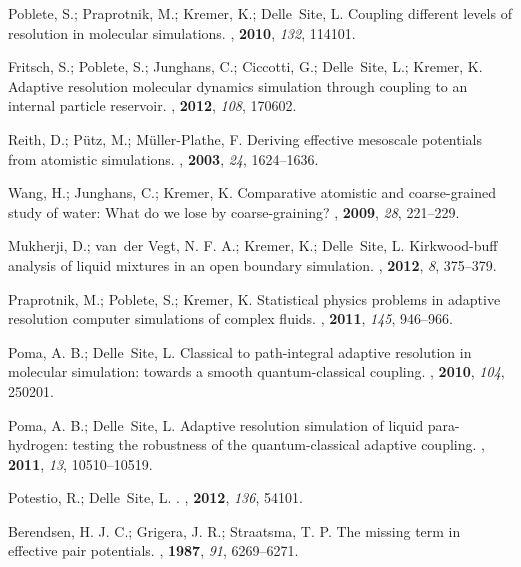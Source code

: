 \documentclass[aps,prb,preprint,citeautoscript]{revtex4}
\begin{document}
\begin{thebibliography}{10}
Poblete, S.; Praprotnik, M.; Kremer, K.; Delle~Site, L.
\newblock Coupling different levels of resolution in molecular simulations.
, \textbf{2010}, \textit{132}, 114101.

Fritsch, S.; Poblete, S.; Junghans, C.; Ciccotti, G.; Delle~Site, L.; Kremer, K.
\newblock Adaptive resolution molecular dynamics simulation through coupling to
  an internal particle reservoir.
, \textbf{2012}, \textit{108}, 170602.

Reith, D.; P{\"u}tz, M.; M{\"u}ller-Plathe, F.
\newblock Deriving effective mesoscale potentials from atomistic simulations.
, \textbf{2003}, \textit{24}, 1624--1636.

Wang, H.; Junghans, C.; Kremer, K.
\newblock Comparative atomistic and coarse-grained study of water: What do we
  lose by coarse-graining?
, \textbf{2009}, \textit{28}, 221--229.

Mukherji, D.; van~der Vegt, N. F. A.; Kremer, K.; Delle~Site, L.
\newblock Kirkwood-buff analysis of liquid mixtures in an open boundary
  simulation.
, \textbf{2012},  \textit{8}, 375--379.

Praprotnik, M.; Poblete, S.; Kremer, K.
\newblock Statistical physics problems in adaptive resolution computer
  simulations of complex fluids.
, \textbf{2011}, \textit{145}, 946--966.

Poma, A. B.; Delle~Site, L.
\newblock Classical to path-integral adaptive resolution in molecular
  simulation: towards a smooth quantum-classical coupling.
, \textbf{2010}, \textit{104}, 250201.

Poma, A. B.; Delle~Site, L.
\newblock Adaptive resolution simulation of liquid para-hydrogen: testing the
  robustness of the quantum-classical adaptive coupling.
, \textbf{2011}, \textit{13}, 10510--10519.

Potestio, R.; Delle~Site, L.
.
, \textbf{2012}, \textit{136}, 54101.

Berendsen, H. J. C.; Grigera, J. R.; Straatsma, T. P.
\newblock The missing term in effective pair potentials.
, \textbf{1987}, \textit{91}, 6269--6271.


\end{thebibliography}
\end{document}
